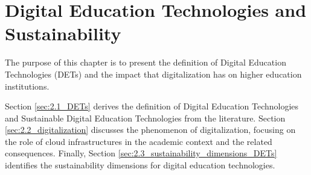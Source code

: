 \chapter{Digital Education Technologies and Sustainability}
\label{cha:2_dets-and-sustainability}
The purpose of this chapter is to present the definition of Digital Education Technologies (DETs) and the impact that digitalization has on higher education institutions. 

Section \ref{sec:2.1_DETs} derives the definition of Digital Education Technologies and Sustainable Digital Education Technologies from the literature. Section \ref{sec:2.2_digitalization} discusses the phenomenon of digitalization, focusing on the role of cloud infrastructures in the academic context and the related consequences. Finally, Section \ref{sec:2.3_sustainability_dimensions_DETs} identifies the sustainability dimensions for digital education technologies.


